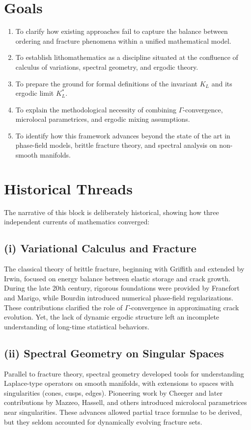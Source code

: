 \section*{Goals}
\begin{enumerate}[label=G\arabic*., leftmargin=*]
\item To clarify how existing approaches fail to capture the balance between ordering and fracture phenomena within a unified mathematical model.
\item To establish lithomathematics as a discipline situated at the confluence of calculus of variations, spectral geometry, and ergodic theory.
\item To prepare the ground for formal definitions of the invariant $K_L$ and its ergodic limit $K_L^*$.
\item To explain the methodological necessity of combining $\Gamma$-convergence, microlocal parametrices, and ergodic mixing assumptions.
\item To identify how this framework advances beyond the state of the art in phase-field models, brittle fracture theory, and spectral analysis on non-smooth manifolds.
\end{enumerate}

\section*{Historical Threads}
The narrative of this block is deliberately historical, showing how three independent currents of mathematics converged:

\subsection*{(i) Variational Calculus and Fracture}
The classical theory of brittle fracture, beginning with Griffith and extended by Irwin, focused on energy balance between elastic storage and crack growth. During the late 20th century, rigorous foundations were provided by Francfort and Marigo, while Bourdin introduced numerical phase-field regularizations. These contributions clarified the role of $\Gamma$-convergence in approximating crack evolution. Yet, the lack of dynamic ergodic structure left an incomplete understanding of long-time statistical behaviors.

\subsection*{(ii) Spectral Geometry on Singular Spaces}
Parallel to fracture theory, spectral geometry developed tools for understanding Laplace-type operators on smooth manifolds, with extensions to spaces with singularities (cones, cusps, edges). Pioneering work by Cheeger and later contributions by Mazzeo, Hassell, and others introduced microlocal parametrices near singularities. These advances allowed partial trace formulae to be derived, but they seldom accounted for dynamically evolving fracture sets.

